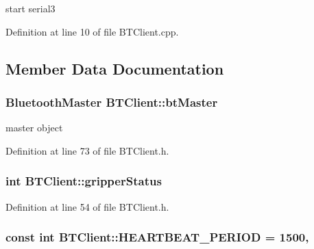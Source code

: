 start serial3 



Definition at line 10 of file B\-T\-Client.\-cpp.



\subsection{Member Data Documentation}
\hypertarget{classBTClient_a5376be2a850c64faab1e9a02adcd342b}{
\subsubsection[{bt\-Master}]{\setlength{\rightskip}{0pt plus 5cm}Bluetooth\-Master B\-T\-Client\-::bt\-Master\hspace{0.3cm}{\ttfamily [private]}}}\label{classBTClient_a5376be2a850c64faab1e9a02adcd342b}


master object 



Definition at line 73 of file B\-T\-Client.\-h.

\hypertarget{classBTClient_acdb5a8d964742a7236d2d0acc2e45585}{
\subsubsection[{gripper\-Status}]{\setlength{\rightskip}{0pt plus 5cm}int B\-T\-Client\-::gripper\-Status}}\label{classBTClient_acdb5a8d964742a7236d2d0acc2e45585}


Definition at line 54 of file B\-T\-Client.\-h.

\hypertarget{classBTClient_a9467446e5173d60a224c22f07dbba8de}{
\subsubsection[{H\-E\-A\-R\-T\-B\-E\-A\-T\-\_\-\-P\-E\-R\-I\-O\-D}]{\setlength{\rightskip}{0pt plus 5cm}const int B\-T\-Client\-::\-H\-E\-A\-R\-T\-B\-E\-A\-T\-\_\-\-P\-E\-R\-I\-O\-D = 1500\hspace{0.3cm}{\ttfamily [static]}, {\ttfamily [private]}}}\label{classBTClient_a9467446e5173d60a224c22f07dbba8de}


